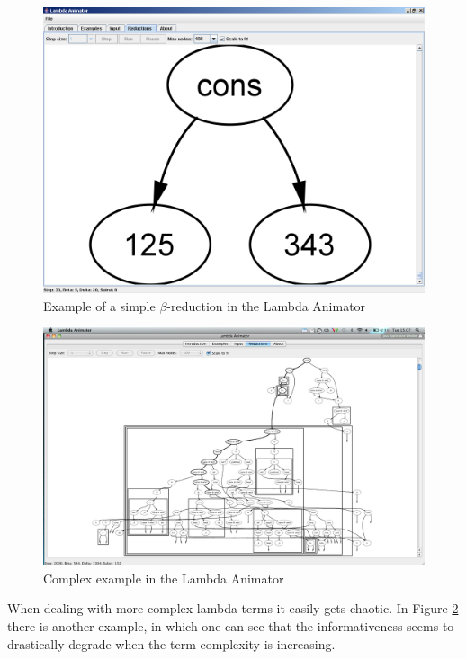 \begin{figure}[!htbp]
	\centering
		\includegraphics[scale=0.25]{../images/lambdaAnimatorReduction.png}
	\caption{Example of a simple $\beta$-reduction in the Lambda Animator}
	\label{fig:images_lambdaAnimatorReduction}
\end{figure}

\begin{figure}[!htbp]
	\centering
		\includegraphics[scale=0.25]{../images/lambdaAnimatorComplex.png}
	\caption{Complex example in the Lambda Animator}
	\label{fig:images_lambdaAnimatorComplex}
\end{figure}

When dealing with more complex lambda terms it easily gets chaotic. In Figure
\ref{fig:images_lambdaAnimatorComplex} there is another example, in which one
can see that the informativeness seems to drastically degrade when the term
complexity is increasing.


